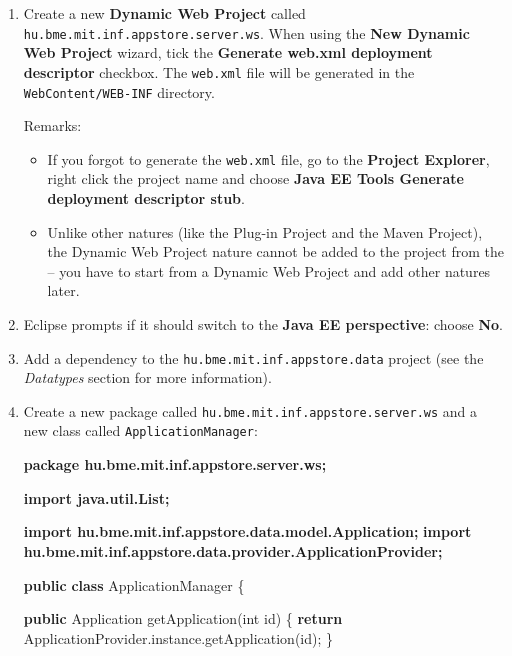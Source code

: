 \documentclass[]{report}
\newenvironment{Shaded}{}{}
\newcommand{\KeywordTok}[1]{\textcolor[rgb]{0.00,0.44,0.13}{\textbf{{#1}}}}
\newcommand{\DataTypeTok}[1]{\textcolor[rgb]{0.56,0.13,0.00}{{#1}}}
\newcommand{\FunctionTok}[1]{\textcolor[rgb]{0.02,0.16,0.49}{{#1}}}
\newcommand{\NormalTok}[1]{{#1}}
\begin{document}
\begin{enumerate}
\def\labelenumi{\arabic{enumi}.}
\item
  Create a new \textbf{Dynamic Web Project} called
  \texttt{hu.bme.mit.inf.appstore.server.ws}. When using the \textbf{New
  Dynamic Web Project} wizard, tick the \textbf{Generate web.xml
  deployment descriptor} checkbox. The \texttt{web.xml} file will be
  generated in the \texttt{WebContent/WEB-INF} directory.

  Remarks:

  \begin{itemize}
  \itemsep1pt\parskip0pt
  \item
    If you forgot to generate the \texttt{web.xml} file, go to the
    \textbf{Project Explorer}, right click the project name and choose
    \textbf{Java EE Tools \textbar{} Generate deployment descriptor
    stub}.
  \item
    Unlike other natures (like the Plug-in Project and the Maven
    Project), the Dynamic Web Project nature cannot be added to the
    project from the -- you have to start from a Dynamic Web Project and
    add other natures later.
  \end{itemize}
\item
  Eclipse prompts if it should switch to the \textbf{Java EE
  perspective}: choose \textbf{No}.
\item
  Add a dependency to the \texttt{hu.bme.mit.inf.appstore.data} project
  (see the \emph{Datatypes} section for more information).
\item
  Create a new package called \texttt{hu.bme.mit.inf.appstore.server.ws}
  and a new class called \texttt{ApplicationManager}:

\begin{Shaded}
\begin{Highlighting}[]
\KeywordTok{package hu.bme.mit.inf.appstore.server.ws;}

\KeywordTok{import java.util.List;}

\KeywordTok{import hu.bme.mit.inf.appstore.data.model.Application;}
\KeywordTok{import hu.bme.mit.inf.appstore.data.provider.ApplicationProvider;}

\KeywordTok{public} \KeywordTok{class} \NormalTok{ApplicationManager \{}

  \KeywordTok{public} \NormalTok{Application }\FunctionTok{getApplication}\NormalTok{(}\DataTypeTok{int} \NormalTok{id) \{}
    \KeywordTok{return} \NormalTok{ApplicationProvider.}\FunctionTok{instance}\NormalTok{.}\FunctionTok{getApplication}\NormalTok{(id);}
  \NormalTok{\}}


\end{Highlighting}
\end{Shaded}
\end{enumerate}
\end{document}
